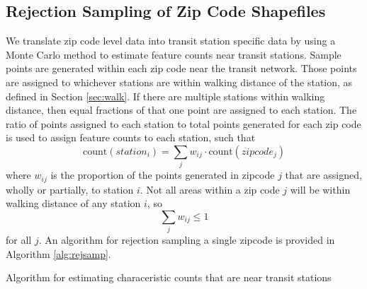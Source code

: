 \documentclass[11pt]{article}
\begin{document}
\subsection{Rejection Sampling of Zip Code Shapefiles}\label{sec:sampling}

We translate zip code level data into transit station specific data by using a Monte Carlo method to estimate feature counts near transit stations. Sample points are generated within each zip code near the transit network. Those points are assigned to whichever stations are within walking distance of the station, as defined in Section \ref{sec:walk}. If there are multiple stations within walking distance, then equal fractions of that one point are assigned to each station. The ratio of points assigned to each station to total points generated for each zip code is used to assign feature counts to each station, such that
\[\text{count}(station_i) = \sum_j w_{ij} \cdot \text{count}(zipcode_j)\]
where $w_{ij}$ is the proportion of the points generated in zipcode $j$ that are assigned, wholly or partially, to station $i$. Not all areas within a zip code $j$ will be within walking distance of any station $i$, so 
\[\sum_j w_{ij} \leq 1\] for all $j$. An algorithm for rejection sampling a single zipcode is provided in Algorithm \ref{alg:rejsamp}.


\begin{algorithm}\begingroup\fontsize{10}{10}\selectfont
\begin{algorithmic}
	\EndIf
\EndWhile
{}
		\EndFor
		\EndFor
	\EndIf
\EndFor
\end{algorithmic}\endgroup\caption{Algorithm for estimating characeristic counts that are near transit stations}\label{alg:rejsamp}
\end{algorithm}
\end{document}
